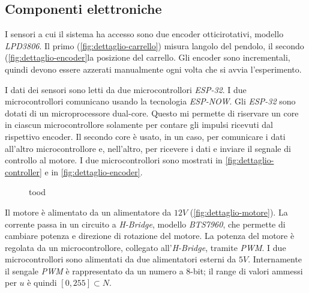 \subsection{Componenti elettroniche}
\label{subsec:componenti-elettroniche}

I sensori a cui il sistema ha accesso sono due encoder ottici\footnotemark rotativi,
modello \emph{LPD3806}. Il primo (\autoref{fig:dettaglio-carrello}) misura langolo del pendolo,
il secondo (\autoref{fig:dettaglio-encoder}la posizione del carrello.
Gli encoder sono incrementali, quindi devono essere azzerati manualmente
ogni volta che si avvia l'esperimento.


I dati dei sensori sono letti da due microcontrollori \emph{ESP-32}.
I due microcontrollori comunicano usando la tecnologia \emph{ESP-NOW}.
Gli \emph{ESP-32} sono dotati di un microprocessore dual-core. Questo mi
permette di riservare un core in ciascun microcontrollore solamente per contare
gli impulsi ricevuti dal rispettivo encoder. Il secondo core è usato, in un caso,
per comunicare i dati all'altro microcontrollore e, nell'altro, per ricevere i dati
e inviare il segnale di controllo al motore. I due microcontrollori sono mostrati
in \autoref{fig:dettaglio-controller} e in \autoref{fig:dettaglio-encoder}.

\begin{figure}[h]
    \centering
    \caption[todo]{tood}
    \label{fig:dettaglio-controller}
\end{figure}

Il motore è alimentato da un alimentatore da $12V$ (\autoref{fig:dettaglio-motore}).
La corrente passa in un circuito a \emph{H-Bridge}, modello \emph{BTS7960},
che permette di cambiare potenza e direzione di rotazione del motore.
La potenza del motore è regolata da un microcontrollore, collegato all'\emph{H-Bridge}, tramite \emph{PWM}\footnotemark. I due microcontrollori sono alimentati da due alimentatori esterni da $5V$. Internamente il sengale \emph{PWM} è rappresentato da un
numero a $8$-bit; il range di valori ammessi per $u$ è quindi $[0, 255] \subset N$.

